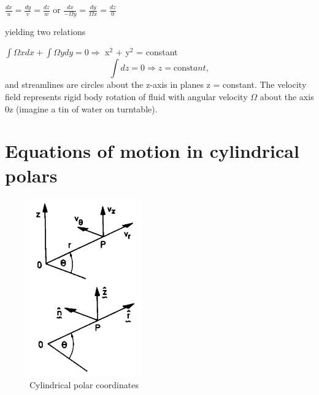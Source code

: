 \documentclass[10pt]{report}
\begin{document}
\begin{examplebox}
\begin{examplesolution2}
	$\frac{dx}{u}=\frac{dy}{v}=\frac{dz}{w}$ or
	$\frac{dx}{-\Omega y}=\frac{dy}{\Omega x}=\frac{dz}{0}$

	yielding two relations

	$\int {\Omega xdx+\int {\Omega
	ydy=0\Rightarrow } } $ x$^{2}$ + y$^{2}$ =
	constant
	\[
	\int
	{dz=0
	\Rightarrow
	z=\mbox{const}}
	ant,
	\]
	and streamlines are circles about the z-axis in planes z = constant. The
	velocity field represents rigid body rotation of fluid with angular velocity
	$\Omega $ about the axis 0z (imagine a tin of water on turntable).
\end{examplesolution2}
\end{examplebox}


\section{Equations of motion in cylindrical polars}

\begin{figure}
\centerline{\includegraphics[width=1.9in]{Section29.pdf}}
\label{fig9}
\caption{ Cylindrical polar coordinates }
\end{figure}
\end{document}
